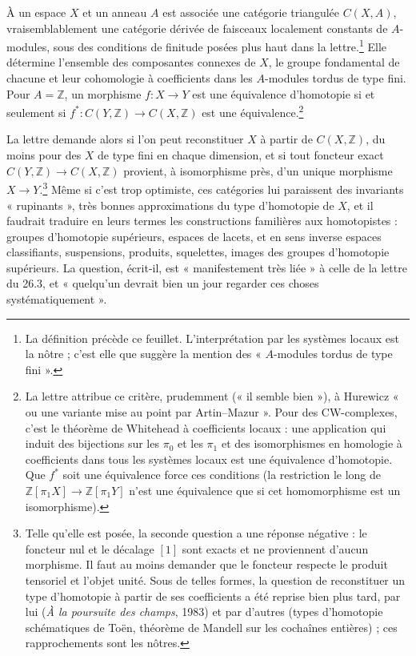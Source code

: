 \documentclass[11pt,a4paper]{article}
\begin{document}
À un espace $X$ et un anneau $A$ est associée une catégorie triangulée
$C(X,A)$, vraisemblablement une catégorie dérivée de faisceaux localement
constants de $A$-modules, sous des conditions de finitude posées plus haut
dans la lettre.\footnote{La définition précède ce feuillet. L'interprétation
par les systèmes locaux est la nôtre ; c'est elle que suggère la mention des
« $A$-modules tordus de type fini ».} Elle détermine l'ensemble des
composantes connexes de $X$, le groupe fondamental de chacune et leur
cohomologie à coefficients dans les $A$-modules tordus de type fini. Pour $A =
\mathbb{Z}$, un morphisme $f : X \to Y$ est une équivalence d'homotopie si et
seulement si $f^{*} : C(Y,\mathbb{Z}) \to C(X,\mathbb{Z})$ est une
équivalence.\footnote{La lettre attribue ce critère, prudemment (« il semble
bien »), à Hurewicz « ou une variante mise au point par Artin--Mazur ». Pour
des CW-complexes, c'est le théorème de Whitehead à coefficients locaux : une
application qui induit des bijections sur les $\pi_{0}$ et les $\pi_{1}$ et des
isomorphismes en homologie à coefficients dans tous les systèmes locaux est
une équivalence d'homotopie. Que $f^{*}$ soit une équivalence force ces
conditions (la restriction le long de $\mathbb{Z}[\pi_{1}X] \to
\mathbb{Z}[\pi_{1}Y]$ n'est une équivalence que si cet homomorphisme est un
isomorphisme).}

La lettre demande alors si l'on peut reconstituer $X$ à partir de
$C(X,\mathbb{Z})$, du moins pour des $X$ de type fini en chaque dimension, et
si tout foncteur exact $C(Y,\mathbb{Z}) \to C(X,\mathbb{Z})$ provient, à
isomorphisme près, d'un unique morphisme $X \to Y$.\footnote{Telle qu'elle est
posée, la seconde question a une réponse négative : le foncteur nul et le
décalage $[1]$ sont exacts et ne proviennent d'aucun morphisme. Il faut au
moins demander que le foncteur respecte le produit tensoriel et l'objet
unité. Sous de telles formes, la question de reconstituer un type d'homotopie
à partir de ses coefficients a été reprise bien plus tard, par lui (\emph{À la
poursuite des champs}, 1983) et par d'autres (types d'homotopie
schématiques de Toën, théorème de Mandell sur les cochaînes entières) ; ces
rapprochements sont les nôtres.} Même si c'est trop optimiste, ces catégories
lui paraissent des invariants « rupinants », très bonnes approximations du
type d'homotopie de $X$, et il faudrait traduire en leurs termes les
constructions familières aux homotopistes : groupes d'homotopie supérieurs,
espaces de lacets, et en sens inverse espaces classifiants, suspensions,
produits, squelettes, images des groupes d'homotopie supérieurs. La question,
écrit-il, est « manifestement très liée » à celle de la lettre du 26.3, et
« quelqu'un devrait bien un jour regarder ces choses systématiquement ».
\end{document}
